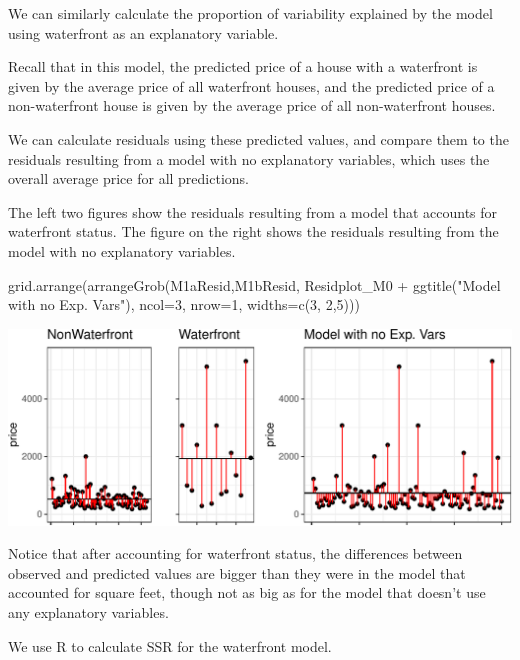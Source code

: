 \documentclass[
  letterpaper,
  DIV=11,
  numbers=noendperiod]{scrreprt}
\newenvironment{Shaded}{\begin{snugshade}}{\end{snugshade}}
\newcommand{\AttributeTok}[1]{\textcolor[rgb]{0.40,0.45,0.13}{#1}}
\newcommand{\DecValTok}[1]{\textcolor[rgb]{0.68,0.00,0.00}{#1}}
\newcommand{\FunctionTok}[1]{\textcolor[rgb]{0.28,0.35,0.67}{#1}}
\newcommand{\NormalTok}[1]{\textcolor[rgb]{0.00,0.23,0.31}{#1}}
\newcommand{\SpecialCharTok}[1]{\textcolor[rgb]{0.37,0.37,0.37}{#1}}
\newcommand{\StringTok}[1]{\textcolor[rgb]{0.13,0.47,0.30}{#1}}
\begin{document}
We can similarly calculate the proportion of variability explained by
the model using waterfront as an explanatory variable.

Recall that in this model, the predicted price of a house with a
waterfront is given by the average price of all waterfront houses, and
the predicted price of a non-waterfront house is given by the average
price of all non-waterfront houses.

We can calculate residuals using these predicted values, and compare
them to the residuals resulting from a model with no explanatory
variables, which uses the overall average price for all predictions.

The left two figures show the residuals resulting from a model that
accounts for waterfront status. The figure on the right shows the
residuals resulting from the model with no explanatory variables.

\begin{Shaded}
\begin{Highlighting}[]
\FunctionTok{grid.arrange}\NormalTok{(}\FunctionTok{arrangeGrob}\NormalTok{(M1aResid,M1bResid, Residplot\_M0 }\SpecialCharTok{+} \FunctionTok{ggtitle}\NormalTok{(}\StringTok{"Model with no Exp. Vars"}\NormalTok{), }\AttributeTok{ncol=}\DecValTok{3}\NormalTok{, }\AttributeTok{nrow=}\DecValTok{1}\NormalTok{, }\AttributeTok{widths=}\FunctionTok{c}\NormalTok{(}\DecValTok{3}\NormalTok{, }\DecValTok{2}\NormalTok{,}\DecValTok{5}\NormalTok{))) }
\end{Highlighting}
\end{Shaded}

\includegraphics{Ch2_files/figure-pdf/unnamed-chunk-33-1.pdf}

Notice that after accounting for waterfront status, the differences
between observed and predicted values are bigger than they were in the
model that accounted for square feet, though not as big as for the model
that doesn't use any explanatory variables.

We use R to calculate SSR for the waterfront model.
\end{document}
